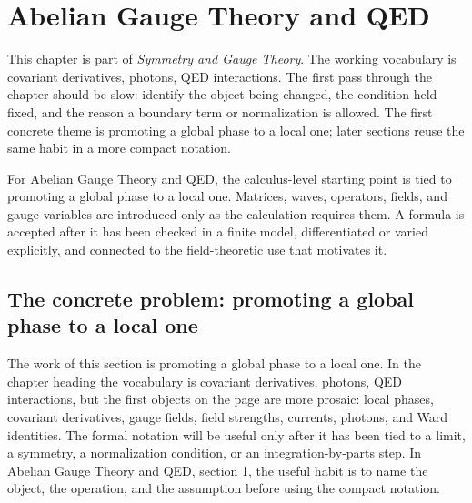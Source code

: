 \chapter{Abelian Gauge Theory and QED}


This chapter is part of \emph{Symmetry and Gauge Theory}.  The working vocabulary is covariant derivatives, photons, QED interactions.  The first pass through the chapter should be slow: identify the object being changed, the condition held fixed, and the reason a boundary term or normalization is allowed.  The first concrete theme is promoting a global phase to a local one; later sections reuse the same habit in a more compact notation.

For Abelian Gauge Theory and QED, the calculus-level starting point is tied to promoting a global phase to a local one.  Matrices, waves, operators, fields, and gauge variables are introduced only as the calculation requires them.  A formula is accepted after it has been checked in a finite model, differentiated or varied explicitly, and connected to the field-theoretic use that motivates it.

\section{The concrete problem: promoting a global phase to a local one}













The work of this section is promoting a global phase to a local one.  In the chapter heading the vocabulary is covariant derivatives, photons, QED interactions, but the first objects on the page are more prosaic: local phases, covariant derivatives, gauge fields, field strengths, currents, photons, and Ward identities.  The formal notation will be useful only after it has been tied to a limit, a symmetry, a normalization condition, or an integration-by-parts step.  In Abelian Gauge Theory and QED, section 1, the useful habit is to name the object, the operation, and the assumption before using the compact notation.

